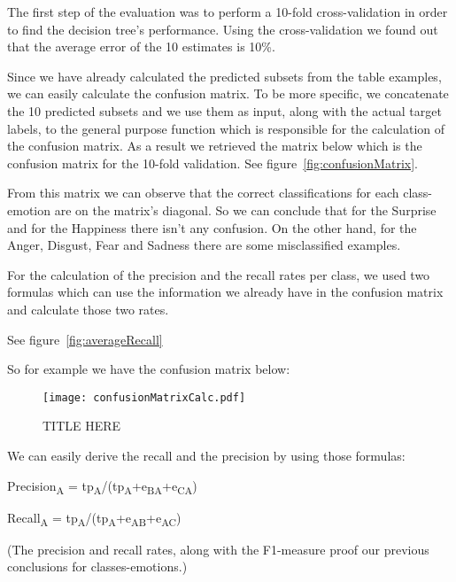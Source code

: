 The first step of the evaluation was to perform a 10-fold cross-validation in
order to find the decision tree's performance. Using the cross-validation we
found out that the average error of the 10 estimates is 10\%. 

Since we have already calculated the predicted subsets from the table examples, we can easily calculate the confusion matrix. To be more specific, we concatenate the 10 predicted subsets and we use them as input, along with the actual target labels, to the general purpose function which is responsible for the calculation of the confusion matrix.  As a result we retrieved the matrix below which is the confusion matrix for the 10-fold validation.
See figure~\ref{fig:confusionMatrix}.


From this matrix we can observe that the correct classifications for each
class-emotion are on the matrix's diagonal. So we can conclude that for the
Surprise and for the Happiness there isn't any confusion. On the other hand, for the Anger, Disgust, Fear and Sadness there are some misclassified examples. 

For the calculation of the precision and the recall rates per class, we used two formulas which can use the information we already have in the confusion matrix and calculate those two rates.

See figure~\ref{fig:averageRecall}


So for example we have the confusion matrix below:

\begin{figure}[h]
    \centering
    \texttt{[image: confusionMatrixCalc.pdf]}
    \caption{TITLE HERE}
    \label{fig:confisionMatixCalc}
\end{figure}

We can easily derive the recall and the precision by using those formulas:

Precision\textsubscript{A} = tp\textsubscript{A}/(tp\textsubscript{A}+e\textsubscript{BA}+e\textsubscript{CA})

Recall\textsubscript{A} = tp\textsubscript{A}/(tp\textsubscript{A}+e\textsubscript{AB}+e\textsubscript{AC})

(The precision and recall rates, along with the F1-measure proof our previous conclusions for classes-emotions.)
